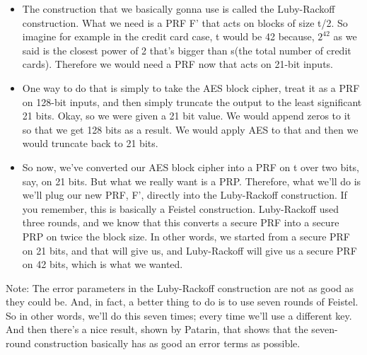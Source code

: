 \documentclass[11pt]{article}
\begin{document}
\begin{itemize}
\item
  The construction that we basically gonna use is called the
  Luby-Rackoff construction. What we need is a PRF F' that acts on
  blocks of size t/2. So imagine for example in the credit card case, t
  would be 42 because, \(2^{42}\) as we said is the closest power of 2
  that's bigger than s(the total number of credit cards). Therefore we
  would need a PRF now that acts on 21-bit inputs.
\item
  One way to do that is simply to take the AES block cipher, treat it as
  a PRF on 128-bit inputs, and then simply truncate the output to the
  least significant 21 bits. Okay, so we were given a 21 bit value. We
  would append zeros to it so that we get 128 bits as a result. We would
  apply AES to that and then we would truncate back to 21 bits.
\item
  So now, we've converted our AES block cipher into a PRF on t over two
  bits, say, on 21 bits. But what we really want is a PRP. Therefore,
  what we'll do is we'll plug our new PRF, F', directly into the
  Luby-Rackoff construction. If you remember, this is basically a
  Feistel construction. Luby-Rackoff used three rounds, and we know that
  this converts a secure PRF into a secure PRP on twice the block size.
  In other words, we started from a secure PRF on 21 bits, and that will
  give us, and Luby-Rackoff will give us a secure PRF on 42 bits, which
  is what we wanted.
\end{itemize}

Note: The error parameters in the Luby-Rackoff construction are not as
good as they could be. And, in fact, a better thing to do is to use
seven rounds of Feistel. So in other words, we'll do this seven times;
every time we'll use a different key. And then there's a nice result,
shown by Patarin, that shows that the seven-round construction basically
has as good an error terms as possible.
\end{document}
